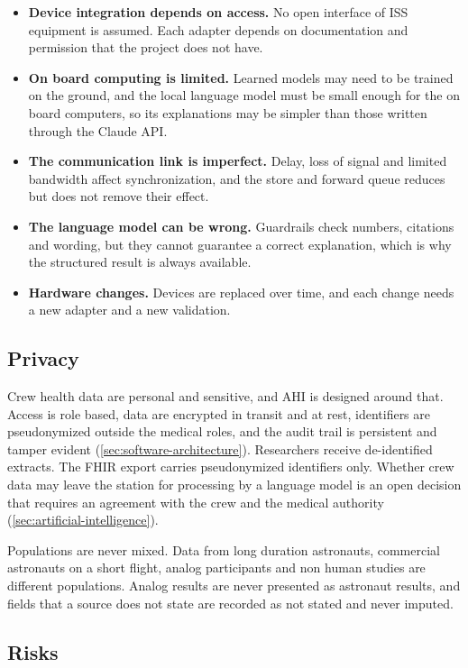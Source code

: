 \begin{itemize}
\item \textbf{Device integration depends on access.} No open interface of ISS equipment is assumed. Each adapter depends on documentation and permission that the project does not have.
\item \textbf{On board computing is limited.} Learned models may need to be trained on the ground, and the local language model must be small enough for the on board computers, so its explanations may be simpler than those written through the Claude API.
\item \textbf{The communication link is imperfect.} Delay, loss of signal and limited bandwidth affect synchronization, and the store and forward queue reduces but does not remove their effect.
\item \textbf{The language model can be wrong.} Guardrails check numbers, citations and wording, but they cannot guarantee a correct explanation, which is why the structured result is always available.
\item \textbf{Hardware changes.} Devices are replaced over time, and each change needs a new adapter and a new validation.
\end{itemize}

\subsection{Privacy}
\label{subsec:privacy}

Crew health data are personal and sensitive, and AHI is designed around that. Access is role based, data are encrypted in transit and at rest, identifiers are pseudonymized outside the medical roles, and the audit trail is persistent and tamper evident (\ref{sec:software-architecture}). Researchers receive de-identified extracts. The FHIR export carries pseudonymized identifiers only. Whether crew data may leave the station for processing by a language model is an open decision that requires an agreement with the crew and the medical authority (\ref{sec:artificial-intelligence}).

Populations are never mixed. Data from long duration astronauts, commercial astronauts on a short flight, analog participants and non human studies are different populations. Analog results are never presented as astronaut results, and fields that a source does not state are recorded as not stated and never imputed.

\subsection{Risks}
\label{subsec:risks}

